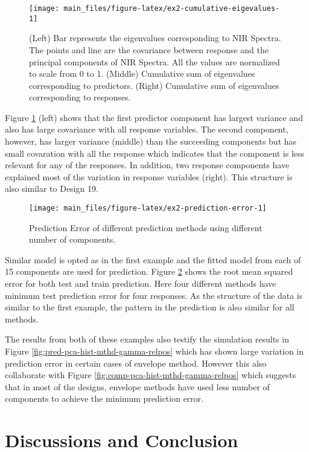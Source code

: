 \documentclass[12pt,3p,authoryear]{elsarticle}
\begin{document}
\begin{figure}
\texttt{[image: main\_files/figure-latex/ex2-cumulative-eigevalues-1]} \caption{(Left) Bar represents the eigenvalues
corresponding to NIR Spectra. The points and line are the covariance
between response and the principal components of NIR Spectra. All the
values are normalized to scale from 0 to 1. (Middle) Cumulative sum of
eigenvalues corresponding to predictors. (Right) Cumulative sum of
eigenvalues corresponding to responses.}\label{fig:ex2-cumulative-eigevalues}
\end{figure}

Figure \ref{fig:ex2-cumulative-eigevalues} (left) shows that the first
predictor component has largest variance and also has large covariance
with all response variables. The second component, however, has larger
variance (middle) than the succeeding components but has small
covaration with all the response which indicates that the component is
less relevant for any of the responses. In addition, two response
components have explained most of the variation in response variables
(right). This structure is also similar to Design 19.

\begin{figure}[!htb]
\texttt{[image: main\_files/figure-latex/ex2-prediction-error-1]} \caption{Prediction Error of different prediction methods using different number of components.}\label{fig:ex2-prediction-error}
\end{figure}

Similar model is opted as in the first example and the fitted model from
each of 15 components are used for prediction. Figure
\ref{fig:ex2-prediction-error} shows the root mean squared error for
both test and train prediction. Here four different methods have minimum
test prediction error for four responses. As the structure of the data
is similar to the first example, the pattern in the prediction is also
similar for all methods.

The results from both of these examples also testify the simulation
results in Figure \ref{fig:pred-pca-hist-mthd-gamma-relpos} which has
shown large variation in prediction error in certain cases of envelope
method. However this also collaborate with Figure
\ref{fig:comp-pca-hist-mthd-gamma-relpos} which suggests that in most of
the designs, envelope methods have used less number of components to
achieve the minimum prediction error.

\section{Discussions and Conclusion}\label{discussions-and-conclusion}
\end{document}
